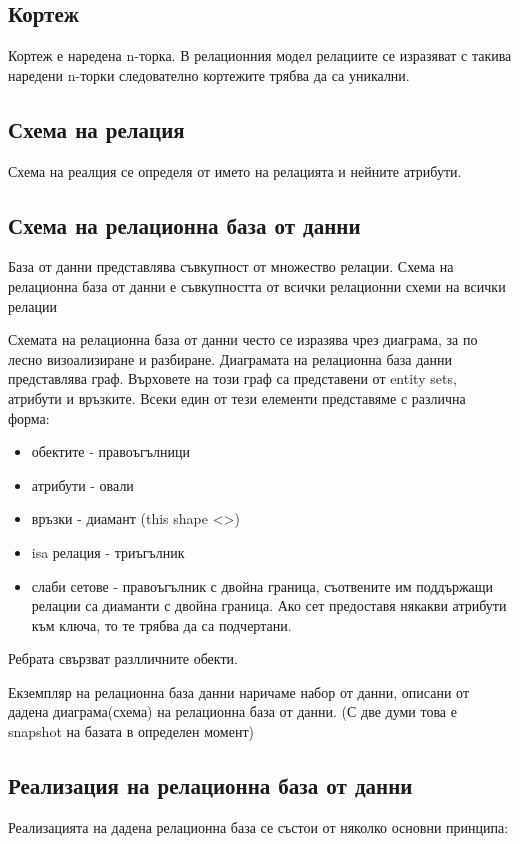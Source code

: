 \documentclass[fleqn,12pt]{article}
\begin{document}
\subsection{Кортеж}
Кортеж е наредена n-торка. В релационния модел релациите се изразяват с такива наредени n-торки следователно кортежите трябва да са уникални. 


\subsection{Схема на релация}
Схема на реалция се определя от името на релацията и нейните атрибути. 


\subsection{Схема на релационна база от данни}
База от данни представлява съвкупност от множество релации. Схема на релационна база от данни е съвкупността от всички релационни схеми на всички релации

Схемата на релационна база от данни често се изразява чрез диаграма, за по лесно визоализиране и разбиране. Диаграмата на релационна база данни представлява граф. Върховете на този граф са представени от entity sets, атрибути и връзките. Всеки един от тези елементи представяме с различна форма:
\begin{itemize}
	\item обектите - правоъгълници
	\item атрибути - овали
	\item връзки - диамант (this shape <>)
	\item isa релация - триъгълник
	\item слаби сетове - правоъгълник с двойна граница, съотвените им поддържащи релации са диаманти с двойна граница. Ако сет предоставя някакви атрибути към ключа, то те трябва да са подчертани.
\end{itemize}

Ребрата свързват разлличните обекти.


Екземпляр на релационна база данни наричаме набор от данни, описани от дадена диаграма(схема) на релационна база от данни. (С две думи това е snapshot на базата в определен момент)


\subsection{Реализация на релационна база от данни}
Реализацията на дадена релационна база се състои от няколко основни принципа:
\end{document}
